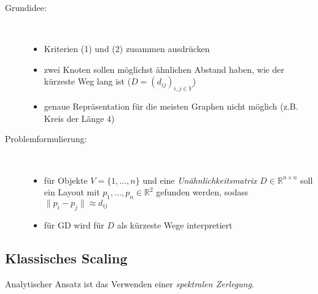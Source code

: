 \begin{description}
	\item[Grundidee:]\ \\\vspace*{-\baselineskip}
		\begin{itemize}[itemsep=-1pt]
			\item Kriterien (1) und (2) zusammen ausdrücken
			\item zwei Knoten sollen möglichst ähnlichen Abstand haben, wie der kürzeste Weg lang ist ($D=(d_{ij})_{i,j\in V}$)
			\item genaue Repräsentation für die meisten Graphen nicht möglich (z.B. Kreis der Länge $4$)
		\end{itemize}
	\item[Problemformulierung:]\ \\\vspace*{-\baselineskip}
		\begin{itemize}[itemsep=-1pt]
			\item für Objekte $V=\{1,\dots,n\}$ und eine \textit{Unähnlichkeitsmatrix} $D\in \mathbb{R}^{n\times n}$ soll ein Layout mit $p_1,\dots,p_n\in \mathbb{R}^2$ gefunden werden, sodass $\|p_i-p_j\|\approx d_{ij}$
			\item für GD wird für $D$ als kürzeste Wege interpretiert
		\end{itemize}
\end{description}
\topbreak
\vspace*{-2\baselineskip}
\subsection{Klassisches Scaling}
Analytischer Ansatz ist das Verwenden einer \textit{spektralen Zerlegung}.
